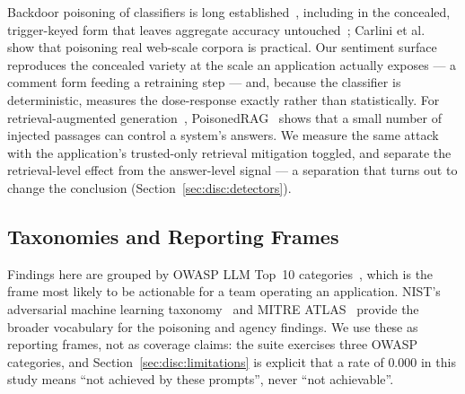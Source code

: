 Backdoor poisoning of classifiers is long
established~\cite{gu2017badnets}, including in the concealed,
trigger-keyed form that leaves aggregate accuracy
untouched~\cite{wallace2021concealed}; Carlini et
al.~\cite{carlini2024poisoning} show that poisoning real web-scale
corpora is practical. Our sentiment surface reproduces the concealed
variety at the scale an application actually exposes --- a comment form
feeding a retraining step --- and, because the classifier is
deterministic, measures the dose-response exactly rather than
statistically. For retrieval-augmented generation~\cite{lewis2020rag},
PoisonedRAG~\cite{zou2025poisonedrag} shows that a small number of
injected passages can control a system's answers. We measure the same
attack with the application's trusted-only retrieval mitigation toggled,
and separate the retrieval-level effect from the answer-level signal ---
a separation that turns out to change the conclusion
(Section~\ref{sec:disc:detectors}).

\subsection{Taxonomies and Reporting Frames}
\label{sec:rel:taxonomy}

Findings here are grouped by OWASP LLM Top~10
categories~\cite{owasp2025}, which is the frame most likely to be
actionable for a team operating an application. NIST's adversarial
machine learning taxonomy~\cite{nist2024aml} and MITRE
ATLAS~\cite{atlas} provide the broader vocabulary for the poisoning and
agency findings. We use these as reporting frames, not as coverage
claims: the suite exercises three OWASP categories, and
Section~\ref{sec:disc:limitations} is explicit that a rate of $0.000$ in
this study means ``not achieved by these prompts'', never ``not
achievable''.
